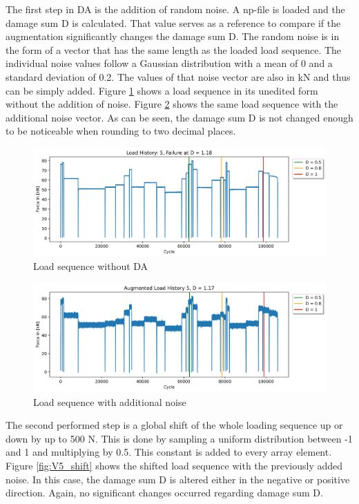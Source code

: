 The first step in DA is the addition of random noise. A np-file is loaded and the damage sum D is calculated. That value serves as a reference to compare if the augmentation significantly changes the damage sum D.
The random noise is in the form of a vector that has the same length as the loaded load sequence.
The individual noise values follow a Gaussian distribution with a mean of 0 and a standard deviation of 0.2. 
The values of that noise vector are also in kN and thus can be simply added.
Figure \ref{fig:V5} shows a load sequence in its unedited form without the addition of noise. Figure \ref{fig:V5_noise} shows the same load sequence with the additional noise vector. As can be seen, the damage sum D is not changed enough to be noticeable when rounding to two decimal places. 

\begin{figure}[H]
	\centering
	\includegraphics[width=1\linewidth]{IMGs/Verlauf_5.jpg}
	\caption{Load sequence without DA}
	\label{fig:V5}
\end{figure}

\begin{figure}[H]
	\centering
	\includegraphics[width=1\linewidth]{IMGs/Verlauf_5_noise.jpg}
	\caption{Load sequence with additional noise}
	\label{fig:V5_noise}
\end{figure}

The second performed step is a global shift of the whole loading sequence up or down by up to 500 N. This is done by sampling a uniform distribution between -1 and 1 and multiplying by 0.5.  This constant is added to every array element. Figure \ref{fig:V5_shift} shows the shifted load sequence with the previously added noise. In this case, the damage sum D is altered either in the negative or positive direction. Again, no significant changes occurred regarding damage sum D.

